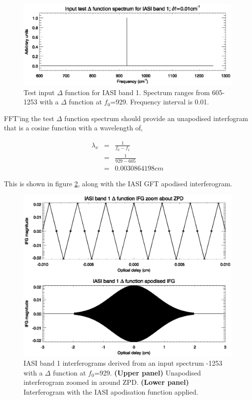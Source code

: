 \begin{figure}[htp]
  \centering
  \includegraphics[scale=0.8]{graphics/band1_deltafn_spc.eps}
  \caption{Test input $\Delta$ function for IASI band 1. Spectrum ranges from 605-1253\invcm{} with a $\Delta$ function at  $f_{0}$=929\invcm. Frequency interval is 0.01\invcm.}
  \label{fig:band1_deltafn_spc}
\end{figure}

FFT'ing the test $\Delta$ function spectrum should provide an unapodised interfogram that is a cosine function with a wavelength of,

\begin{eqnarray*}
  \lambda_{x} & = & \frac{1}{f_{0}-f_{1}}\\
    & = & \frac{1}{929-605}\\
    & = & 0.0030864198cm
\end{eqnarray*}

This is shown in figure \ref{fig:band1_deltafn_ifgs}, along with the IASI GFT apodised interferogram.

\begin{figure}[htp]
  \centering
  \includegraphics[scale=0.8]{graphics/band1_deltafn_ifgs.eps}
  \caption{IASI band 1 interferograms derived from an input spectrum -1253\invcm{} with a $\Delta$ function at  $f_{0}$=929\invcm. \textbf{(Upper panel)} Unapodised interferogram zoomed in around ZPD. \textbf{(Lower panel)} Interferogram with the IASI apodisation function applied.}
  \label{fig:band1_deltafn_ifgs}
\end{figure}

